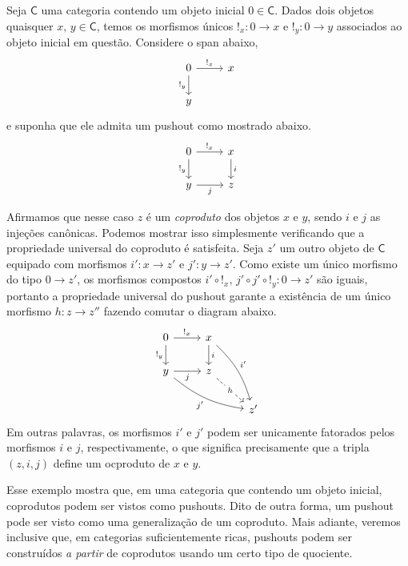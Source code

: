 \begin{exem}
    Seja $\mathsf{C}$ uma categoria contendo um objeto inicial $0 \in \mathsf{C}$.
    Dados dois objetos quaisquer $x,\, y \in \mathsf{C}$, temos os morfismos únicos $!_x: 0 \to x$ e $!_y: 0 \to y$ associados ao objeto inicial em questão.
    Considere o span abaixo,
    \begin{displaymath}
        \begin{tikzcd}
            0
            \arrow[r, "!_x"]
            \arrow[d, "!_y" swap]
            & x
            \\ y
        \end{tikzcd}
    \end{displaymath}
    e suponha que ele admita um pushout como mostrado abaixo.
    \begin{displaymath}
        \begin{tikzcd}
            0
            \arrow[r, "!_x"]
            \arrow[d, "!_y" swap]
            & x
            \arrow[d, "i"]
            \\ y
            \arrow[r, "j" swap]
            & z
        \end{tikzcd}
    \end{displaymath}

    Afirmamos que nesse caso $z$ é um \emph{coproduto} dos objetos $x$ e $y$, sendo $i$ e $j$ as injeções canônicas.
    Podemos mostrar isso simplesmente verificando que a propriedade universal do coproduto é satisfeita.
    Seja $z'$ um outro objeto de $\mathsf{C}$ equipado com morfismos $i': x \to z'$ e $j': y \to z'$.
    Como existe um único morfismo do tipo $0 \to z'$, os morfismos compostos $i' \circ !_x,\, j' \circ j' \circ !_y: 0 \to z'$ são iguais, portanto a propriedade universal do pushout garante a existência de um único morfismo $h: z \to z''$ fazendo comutar o diagram abaixo.
    \begin{displaymath}
        \begin{tikzcd}
            0
            \arrow[r, "!_x"]
            \arrow[d, "!_y" swap]
            & x
            \arrow[d, "i"]
            \arrow[rdd, bend left=15, "i'"]
            \\ y
            \arrow[r, "j" swap]
            \arrow[rrd, bend right=15, "j'" swap]
            & z
            \arrow[rd, dashed, "h" description]
            \\ & & z'
        \end{tikzcd}
    \end{displaymath}
    Em outras palavras, os morfismos $i'$ e $j'$ podem ser unicamente fatorados pelos morfismos $i$ e $j$, respectivamente, o que significa precisamente que a tripla $(z,i,j)$ define um ocproduto de  $x$ e $y$.

    Esse exemplo mostra que, em uma categoria que contendo um objeto inicial, coprodutos podem ser vistos como pushouts.
    Dito de outra forma, um pushout pode ser visto como uma generalização de um coproduto.
    Mais adiante, veremos inclusive que, em categorias suficientemente ricas, pushouts podem ser construídos \emph{a partir} de coprodutos usando um certo tipo de quociente.
\end{exem}


